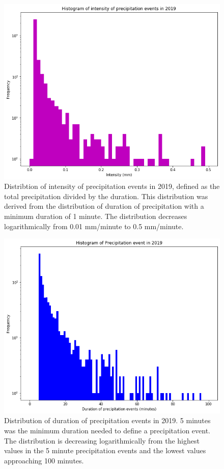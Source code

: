 	\begin{figure}[h]
	\centering
	\includegraphics[width=150mm]{../Figures/intensity_hist_1min.png}
	\caption{Distribtion of intensity of precipitation events in 2019, defined as the total precipitation divided by the duration. This distribution was derived from the distribution of duration of precipitation with a minimum duration of 1 minute. The distribution decreases logarithmically from 0.01 mm/minute to 0.5 mm/minute.}
\end{figure}
\vfill
\begin{figure}[h]
	\centering
	\includegraphics[width=150mm]{../Figures/precip_hist_5min.png}
	\caption{Distribution of duration of precipitation events in 2019. 5 minutes was the minimum duration needed to define a precipitation event. The distribution is decreasing logarithmically from the highest values in the 5 minute precipitation events and the lowest values approaching 100 minutes.}
\end{figure}
